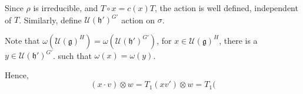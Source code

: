 \documentclass[12pt]{article}
\def\fhh{\mathfrak{h}}
\def\fgg{\mathfrak{g}}
\def\cuu{\mathcal{U}}
\begin{document}
Since $\rho$ is irreducible, and $T\circ x = c(x) T$, 
the action is well defined, independent of $T$. 
Similarly, define $\cuu(\fhh')^{G'}$ action on $\sigma$.

Note that $\omega(\cuu(\fgg)^H) = \omega(\cuu(\fhh')^{G'})$,
for $x\in \cuu(\fgg)^H$, 
there is a $y\in \cuu(\fhh')^{G'}$.
such that $\omega(x) = \omega(y)$.

Hence, 
\[
(x \cdot v)\otimes w 
= T_1(x v') \otimes w
= T_1(
\]

{}

\end{document}
